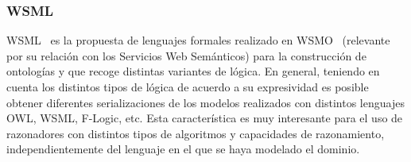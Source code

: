 \subsubsection{WSML}
\gls{WSML}~\cite{WSML2006} es la propuesta de lenguajes formales realizado en \gls{WSMO}~\cite{WSMODeri} 
(relevante por su relación con los Servicios Web Semánticos) para la construcción de ontologías y que recoge 
distintas variantes de lógica. En general, teniendo en cuenta los
distintos tipos de lógica de acuerdo a su expresividad es posible obtener diferentes serializaciones
de los modelos realizados con distintos lenguajes \gls{OWL}, WSML, F-Logic, etc. Esta característica
es muy interesante para el uso de razonadores con distintos tipos de algoritmos y capacidades de
razonamiento, independientemente del lenguaje en el que se haya modelado el dominio.



 
